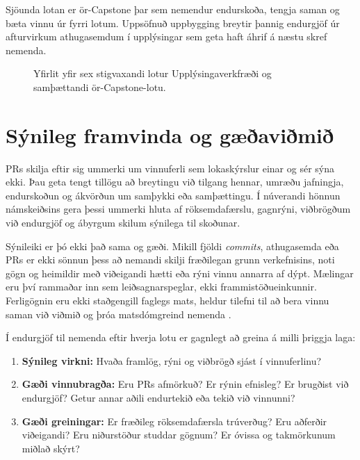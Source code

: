 \documentclass{kennsluakademia_conf}
\begin{document}
Sjöunda lotan er ör-Capstone þar sem nemendur endurskoða, tengja saman og bæta vinnu úr fyrri lotum. Uppsöfnuð uppbygging breytir þannig endurgjöf úr afturvirkum athugasemdum í upplýsingar sem geta haft áhrif á næstu skref nemenda.



\begin{figure}[t]
\centering

\caption{Yfirlit yfir sex stigvaxandi lotur Upplýsingaverkfræði og samþættandi ör-Capstone-lotu.}
\label{fig:progressive-modules}
\end{figure}


\section{Sýnileg framvinda og gæðaviðmið}

PRs skilja eftir sig ummerki um vinnuferli sem lokaskýrslur einar og sér sýna ekki. Þau geta tengt tillögu að breytingu við tilgang hennar, umræðu jafningja, endurskoðun og ákvörðun um samþykki eða samþættingu. Í núverandi hönnun námskeiðsins gera þessi ummerki hluta af röksemdafærslu, gagnrýni, viðbrögðum við endurgjöf og ábyrgum skilum sýnilega til skoðunar.

Sýnileiki er þó ekki það sama og gæði. Mikill fjöldi \emph{commits}, athugasemda eða PRs er ekki sönnun þess að nemandi skilji fræðilegan grunn verkefnisins, noti gögn og heimildir með viðeigandi hætti eða rýni vinnu annarra af dýpt. Mælingar eru því rammaðar inn sem leiðsagnarspeglar, ekki frammistöðueinkunnir. Ferligögnin eru ekki staðgengill faglegs mats, heldur tilefni til að bera vinnu saman við viðmið og þróa matsdómgreind nemenda \citep{TaiEtAl2018EvaluativeJudgement}.

Í endurgjöf til nemenda eftir hverja lotu er gagnlegt að greina á milli þriggja laga:

\begin{enumerate}
  \item \textbf{Sýnileg virkni:} Hvaða framlög, rýni og viðbrögð sjást í vinnuferlinu?
  \item \textbf{Gæði vinnubragða:} Eru PRs afmörkuð? Er rýnin efnisleg? Er brugðist við endurgjöf? Getur annar aðili endurtekið eða tekið við vinnunni?
  \item \textbf{Gæði greiningar:} Er fræðileg röksemdafærsla trúverðug? Eru aðferðir viðeigandi? Eru niðurstöður studdar gögnum? Er óvissa og takmörkunum miðlað skýrt?
\end{enumerate}
\end{document}
